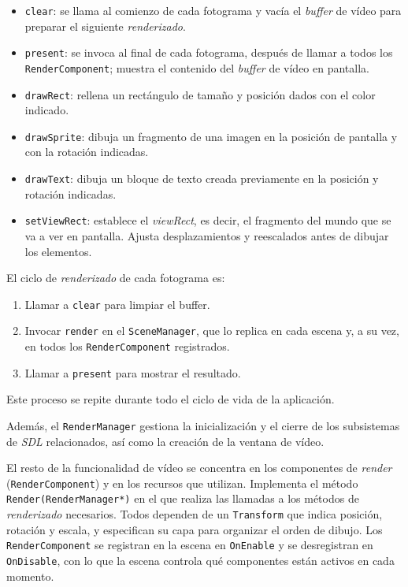 \begin{itemize}
	\item \texttt{clear}: se llama al comienzo de cada fotograma y vacía el \textit{buffer} de vídeo para preparar el siguiente \textit{renderizado}.
	\item \texttt{present}: se invoca al final de cada fotograma, después de llamar a todos los \texttt{RenderComponent}; muestra el contenido del \textit{buffer} de vídeo en pantalla.
	\item \texttt{drawRect}: rellena un rectángulo de tamaño y posición dados con el color indicado.
	\item \texttt{drawSprite}: dibuja un fragmento de una imagen en la posición de pantalla y con la rotación indicadas.
	\item \texttt{drawText}: dibuja un bloque de texto creada previamente en la posición y rotación indicadas. 
	\item \texttt{setViewRect}: establece el \textit{viewRect}, es decir, el fragmento del mundo que se va a ver en pantalla. Ajusta desplazamientos y reescalados antes de dibujar los elementos.
\end{itemize}

El ciclo de \textit{renderizado} de cada fotograma es: 
\begin{enumerate}
	\item Llamar a \texttt{clear} para limpiar el buffer.
	\item Invocar \texttt{render} en el \texttt{SceneManager}, que lo replica en cada escena y, a su vez, en todos los \texttt{RenderComponent} registrados. 
	\item Llamar a \texttt{present} para mostrar el resultado.
\end{enumerate}

Este proceso se repite durante todo el ciclo de vida de la aplicación.

\medskip

Además, el \texttt{RenderManager} gestiona la inicialización y el cierre de los subsistemas de \textit{SDL} relacionados, así como la creación de la ventana de vídeo.

\medskip

El resto de la funcionalidad de vídeo se concentra en los componentes de \textit{render} (\texttt{RenderComponent}) y en los recursos que utilizan. Implementa el método \texttt{Render(RenderManager*)} en el que realiza las llamadas a los métodos de \textit{renderizado} necesarios. Todos dependen de un \texttt{Transform} que indica posición, rotación y escala, y especifican su capa para organizar el orden de dibujo. Los \texttt{RenderComponent} se registran en la escena en \texttt{OnEnable} y se desregistran en \texttt{OnDisable}, con lo que la escena controla qué componentes están activos en cada momento.  

